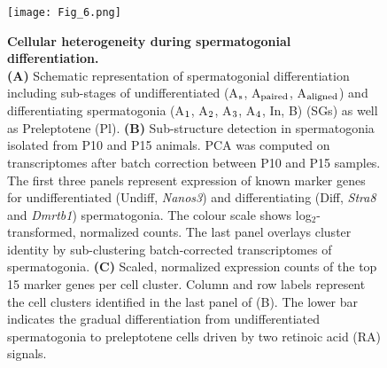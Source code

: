 \newpage

\begin{figure}[!h]
\centering
\texttt{[image: Fig\_6.png]}
\caption[Cellular heterogeneity during spermatogonial differentiation]{\textbf{Cellular heterogeneity during spermatogonial differentiation.} \\
\textbf{(A)} Schematic representation of spermatogonial differentiation including sub-stages of undifferentiated (A$_\textnormal{s}$, A$_\textnormal{paired}$, A$_\textnormal{aligned}$) and differentiating spermatogonia (A$_\textnormal{1}$, A$_\textnormal{2}$, A$_\textnormal{3}$, A$_\textnormal{4}$, In, B) (SGs) as well as Preleptotene (Pl). \textbf{(B)} Sub-structure detection in spermatogonia isolated from P10 and P15 animals. PCA was computed on transcriptomes after batch correction between P10 and P15 samples. The first three panels represent expression of known marker genes for undifferentiated (Undiff, \textit{Nanos3}) and differentiating (Diff, \textit{Stra8} and \textit{Dmrtb1}) spermatogonia. The colour scale shows log$_2$-transformed, normalized counts. The last panel overlays cluster identity by sub-clustering batch-corrected transcriptomes of spermatogonia. \textbf{(C)} Scaled, normalized expression counts of the top 15 marker genes per cell cluster. Column and row labels represent the cell clusters identified in the last panel of (B). The lower bar indicates the gradual differentiation from undifferentiated spermatogonia to preleptotene cells driven by two retinoic acid (RA) signals. }
\label{fig3:spermatogonia}
\end{figure}

